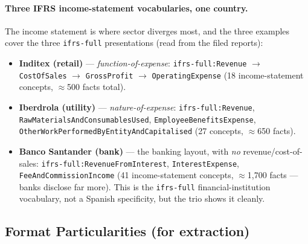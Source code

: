 \documentclass[11pt,a4paper]{report}
\begin{document}
\paragraph{Three IFRS income-statement vocabularies, one country.} The income statement is where sector
diverges most, and the three examples cover the three \texttt{ifrs-full} presentations (read from the filed
reports):
\begin{itemize}[nosep]
  \item \textbf{Inditex (retail)} --- \emph{function-of-expense}: \texttt{ifrs-full:Revenue} \(\to\)
    \texttt{CostOfSales} \(\to\) \texttt{GrossProfit} \(\to\) \texttt{OperatingExpense} (18 income-statement
    concepts, \(\approx\)500 facts total).
  \item \textbf{Iberdrola (utility)} --- \emph{nature-of-expense}: \texttt{ifrs-full:Revenue},
    \texttt{RawMaterialsAndConsumablesUsed}, \texttt{EmployeeBenefitsExpense},
    \texttt{OtherWorkPerformedByEntityAndCapitalised} (27 concepts, \(\approx\)650 facts).
  \item \textbf{Banco Santander (bank)} --- the banking layout, with \emph{no} revenue/cost-of-sales:
    \texttt{ifrs-full:RevenueFromInterest}, \texttt{InterestExpense}, \texttt{FeeAndCommissionIncome} (41
    income-statement concepts, \(\approx\)1{,}700 facts --- banks disclose far more). This is the
    \texttt{ifrs-full} financial-institution vocabulary, not a Spanish specificity, but the trio shows it
    cleanly.
\end{itemize}

\subsection{Format Particularities (for extraction)}
\end{document}

